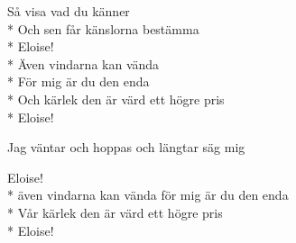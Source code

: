 \begin{SongText}[Eloise]
\begin{SongVerse}
        Så visa vad du känner\\*%
        Och sen får känslorna bestämma\\*%
        Eloise!\\*%
        Även vindarna kan vända\\*%
        För mig är du den enda\\*%
        Och kärlek den är värd ett högre pris\\*%
        Eloise!
    \end{SongVerse}
    \begin{SongVerse}
        Jag väntar och hoppas och längtar säg mig
    \end{SongVerse}
    \begin{SongVerse}
        Eloise!\\*%
        även vindarna kan vända för mig är du den enda\\*%
        Vår kärlek den är värd ett högre pris \\*%
        Eloise!
    \end{SongVerse}
\end{SongText}
